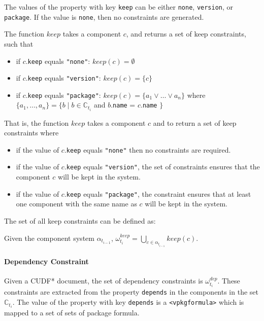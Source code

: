 The values of the property with key \texttt{keep} can be either \texttt{none}, \texttt{version}, or \texttt{package}.
If the value is \texttt{none}, then no constraints are generated.
\begin{defs}
The function $keep$ takes a component $c$, and returns a set of keep constraints, such that
\begin{itemize}
	\item if $c$.\verb+keep+ equals \verb+"none"+: $keep(c) = \emptyset$
	\item if $c$.\verb+keep+ equals \verb+"version"+: $keep(c) = \{c\}$
	\item if $c$.\verb+keep+ equals \verb+"package"+: $keep(c) = \{a_1 \vee \ldots \vee a_n\}$ where $\{a_1,\ldots,a_n\} = \{b \mid b \in \mathbb{C}_{t_i}$ and $b.$\texttt{name} = $c.$\texttt{name} $\}$
\end{itemize}

\end{defs}
That is, the function $keep$ takes a component $c$ and to return a set of keep constraints where
\begin{itemize}
  \item if the value of $c$.\verb+keep+ equals \verb+"none"+ then no constraints are required.
  \item if the value of $c$.\verb+keep+ equals \verb+"version"+, the set of constraints ensures that the component $c$ will be kept in the system.
  \item if the value of $c$.\verb+keep+ equals \verb+"package"+, the constraint ensures that at least one component with the same name as $c$ will be kept in the system.
\end{itemize}

The set of all keep constraints can be defined as:
\begin{defs}
Given the component system $\alpha_{t_{i-1}}$, $\omega_{t_i}^{keep} = \bigcup \limits_{c \in \alpha_{t_{i-1}}} keep(c)$.
\end{defs}

\paragraph{Dependency Constraint}
Given a CUDF* document, the set of dependency constraints is $\omega_{t_i}^{dep}$.
These constraints are extracted from the property \texttt{depends} in the components in the set $\mathbb{C}_{t_i}$.
The value of the property with key \texttt{depends} is a \texttt{<vpkgformula>} which is mapped to a set of sets of package formula.

